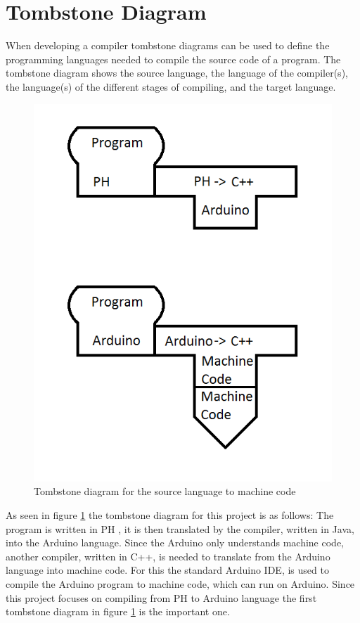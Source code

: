 \section{Tombstone Diagram}
When developing a compiler tombstone diagrams can be used to define the programming languages needed to compile the source code of a program. The tombstone diagram shows the source language, the language of the compiler(s), the language(s) of the different stages of compiling, and the target language.

\begin{figure}[H]
	\centering
		\includegraphics{billeder/tombstone_diagram.png}
		\caption{Tombstone diagram for the source language to machine code}
		\label{fig:tombstone}
\end{figure}

As seen in figure \ref{fig:tombstone} the tombstone diagram for this project is as follows: The program is written in PH , it is then translated by the compiler, written in Java, into the Arduino language. Since the Arduino only understands machine code, another compiler, written in C++, is needed to translate from the Arduino language into machine code. For this the standard Arduino IDE, is used to compile the Arduino program to machine code, which can run on Arduino.
Since this project focuses on compiling from PH to Arduino language the first tombstone diagram in figure \ref{fig:tombstone} is the important one.